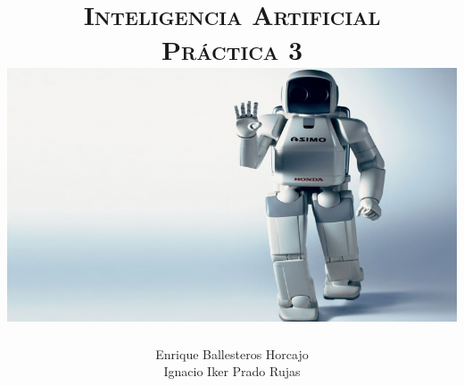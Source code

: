 \documentclass[11pt, a4paper, spanish, openright, twoside]{book}
\begin{document}
 
\title{\Huge{\textsc{Inteligencia Artificial}} \\
	\vspace{0.7cm}
	 \textsc{\Large{Práctica 3}} \\
	\vspace{1.5cm}
	\includegraphics[scale=0.45]{robotHonda}}
\author{Enrique Ballesteros Horcajo\\
	Ignacio Iker Prado Rujas}
\date{\Today}
\maketitle

\newpage
\mbox{}
\thispagestyle{empty}						%
\newpage


\tableofcontents 							%

\newpage
\mbox{}
\thispagestyle{empty}						%
\newpage


\vspace{3cm}


\newpage
\end{document}
